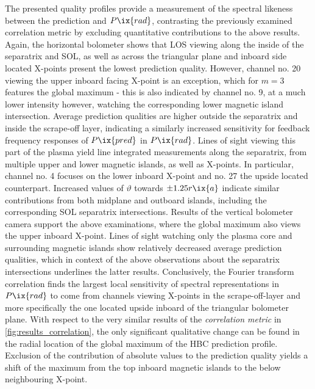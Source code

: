         The presented quality profiles provide a measurement of the spectral likeness between the prediction and $P\ix{rad}$, contrasting the previously examined correlation metric by excluding quantitative contributions to the above results. Again, the horizontal bolometer shows that LOS viewing along the inside of the separatrix and SOL, as well as across the triangular plane and inboard side located X-points present the lowest prediction quality. However, channel no. 20 viewing the upper inboard facing X-point is an exception, which for $m=3$ features the global maximum - this is also indicated by channel no. 9, at a much lower intensity however, watching the corresponding lower magnetic island intersection. Average prediction qualities are higher outside the separatrix and inside the scrape-off layer, indicating a similarly increased sensitivity for feedback frequency responses of $P\ix{pred}$ in $P\ix{rad}$. Lines of sight viewing this part of the plasma yield line integrated measurements along the separatrix, from multiple upper and lower magnetic islands, as well as X-points. In particular, channel no. 4 focuses on the lower inboard X-point and no. 27 the upside located counterpart. Increased values of $\vartheta$ towards $\pm1.25r\ix{a}$ indicate similar contributions from both midplane and outboard islands, including the corresponding SOL separatrix intersections. Results of the vertical bolometer camera support the above examinations, where the global maximum also views the upper inboard X-point. Lines of sight watching only the plasma core and surrounding magnetic islands show relatively decreased average prediction qualities, which in context of the above observations about the separatrix intersections underlines the latter results. Conclusively, the Fourier transform correlation finds the largest local sensitivity of spectral representations in $P\ix{rad}$ to come from channels viewing X-points in the scrape-off-layer and more specifically the one located upside inboard of the triangular bolometer plane. With respect to the very similar results of the \textit{correlation metric} in \cref{fig:results_correlation}, the only significant qualitative change can be found in the radial location of the global maximum of the HBC prediction profile. Exclusion of the contribution of absolute values to the prediction quality yields a shift of the maximum from the top inboard magnetic islands to the below neighbouring X-point.%
%

